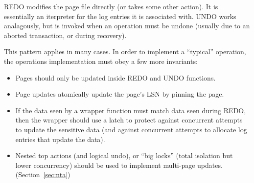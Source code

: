 \documentclass[letterpaper,twocolumn,10pt]{article}
\begin{document}
REDO modifies the page file directly (or takes some other action).  It
is essentially an iterpreter for the log entries it is associated
with.  UNDO works analagously, but is invoked when an operation must
be undone (usually due to an aborted transaction, or during recovery).

This pattern applies in many cases.  In
order to implement a ``typical'' operation, the operations
implementation must obey a few more invariants:

\begin{itemize}
\item Pages should only be updated inside REDO and UNDO functions.
\item Page updates atomically update the page's LSN by pinning the page.
\item If the data seen by a wrapper function must match data seen
  during REDO, then the wrapper should use a latch to protect against
  concurrent attempts to update the sensitive data (and against
  concurrent attempts to allocate log entries that update the data).
\item Nested top actions (and logical undo), or ``big locks'' (total isolation but lower concurrency) should be used to implement multi-page updates. (Section~\ref{sec:nta})
\end{itemize}
\end{document}
